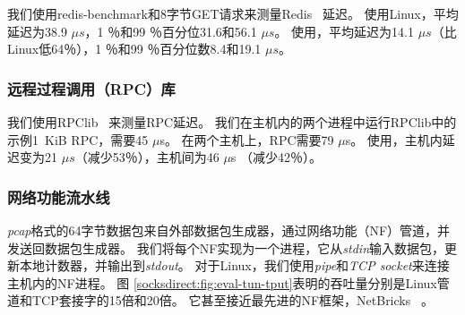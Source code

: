 我们使用redis-benchmark和8字节GET请求来测量Redis~ \cite {redis}延迟。
使用Linux，平均延迟为38.9 $ \mu s $，1 ％和99 ％百分位31.6和56.1 $ \mu s $。
使用\sys {}，平均延迟为14.1 $ \mu s $（比Linux低64％），1 ％和99 ％百分位数8.4和19.1 $ \mu s $。







\subsubsection{远程过程调用（RPC）库}

我们使用RPClib~ \cite {rpclib}来测量RPC延迟。
我们在主机内的两个进程中运行RPClib中的示例1~KiB RPC，需要45 $ \mu $s。 在两个主机上，RPC需要79 $ \mu$s。
使用\sys {}，主机内延迟变为21 $ \mu s $（减少53％），主机间为46 $ \mu$s （减少42％）。

\subsubsection{网络功能流水线}

\emph {pcap}格式的64字节数据包来自外部数据包生成器，通过网络功能（NF）管道，并发送回数据包生成器。
我们将每个NF实现为一个进程，它从\emph {stdin}输入数据包，更新本地计数器，并输出到\emph {stdout}。
对于Linux，我们使用\emph {pipe}和\emph {TCP socket}来连接主机内的NF进程。
图 \ref {socksdirect:fig:eval-tun-tput}表明\sys {}的吞吐量分别是Linux管道和TCP套接字的15倍和20倍。
它甚至接近最先进的NF框架，NetBricks~ \cite {panda2016netbricks}。

